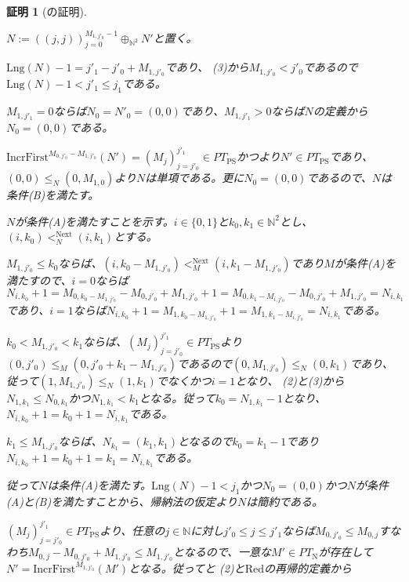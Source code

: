 \documentclass[dvipdfmx,uplatex]{jsarticle}
\theoremstyle{customnonumberbreakfortheorem}
\theoremstyle{customnonumberbreakforproof}
\newtheorem{hideableproof}{証明}
\begin{document}
\begin{hideableproof}[の証明]
\begin{indented}
\begin{indented}
\begin{indented}
\begin{indented}
					\item \(N := ((j,j))_{j=0}^{M_{1,j'_0}-1} \oplus_{\mathbb{N}^2} N'\)と置く。
					\item \(\textrm{Lng}(N)-1 = j'_1-j'_0+M_{1,j'_0}\)であり、 (3)から\(M_{1,j'_0} < j'_0\)であるので\(\textrm{Lng}(N)-1 < j'_1 \leq j_1\)である。
					\item \(M_{1,j'_1} = 0\)ならば\(N_0 = N'_0 = (0,0)\)であり、\(M_{1,j'_1} > 0\)ならば\(N\)の定義から\(N_0 = (0,0)\)である。
					\item \(\textrm{IncrFirst}^{M_{0,j'_0}-M_{1,j'_0}}(N') = (M_j)_{j=j'_0}^{j'_1} \in PT_{\textrm{PS}}\)かつより\(N' \in PT_{\textrm{PS}}\)であり、\((0,0) \leq_N (0,M_{1,0})\)より\(N\)は単項である。更に\(N_0 = (0,0)\)であるので、\(N\)は条件(B)を満たす。
					\item \(N\)が条件(A)を満たすことを示す。\(i \in \{0,1\}\)と\(k_0,k_1 \in \mathbb{N}^2\)とし、\((i,k_0) <_N^{\textrm{Next}} (i,k_1)\)とする。
					\begin{indented}
						\item \(M_{1,j'_0} \leq k_0\)ならば、\((i,k_0-M_{1,j'_0}) <_M^{\textrm{Next}} (i,k_1-M_{1,j'_0})\)であり\(M\)が条件(A)を満たすので、\(i=0\)ならば\(N_{i,k_0}+1 = M_{0,k_0-M_{1,j'_0}}-M_{0,j'_0}+M_{1,j'_0}+1 = M_{0,k_1-M_{i,j'_0}}-M_{0,j'_0}+M_{1,j'_0} = N_{i,k_1}\)であり、\(i=1\)ならば\(N_{i,k_0}+1 = M_{1,k_0-M_{1,j'_0}}+1 = M_{1,k_1-M_{i,j'_0}} = N_{i,k_1}\)である。
						\item \(k_0 < M_{1,j'_0} < k_1\)ならば、\((M_j)_{j=j'_0}^{j'_1} \in PT_{\textrm{PS}}\)より\((0,j'_0) \leq_M (0,j'_0+k_1-M_{1,j'_0})\)であるので\((0,M_{1,j'_0}) \leq_N (0,k_1)\)であり、従って\((1,M_{1,j'_0}) \leq_N (1,k_1)\)でなくかつ\(i=1\)となり、 (2)と(3)から\(N_{1,k_1} \leq N_{0,k_1}\)かつ\(N_{1,k_1} < k_1\)となる。従って\(k_0 = N_{1,k_1}-1\)となり、\(N_{i,k_0}+1 = k_0+1 = N_{i,k_1}\)である。
						\item \(k_1 \leq M_{1,j'_0}\)ならば、\(N_{k_1} = (k_1,k_1)\)となるので\(k_0 = k_1-1\)であり\(N_{i,k_0}+1 = k_0+1 = k_1 = N_{i,k_1}\)である。
					\end{indented}
					\item 従って\(N\)は条件(A)を満たす。\(\textrm{Lng}(N)-1 < j_1\)かつ\(N_0 = (0,0)\)かつ\(N\)が条件(A)と(B)を満たすことから、帰納法の仮定より\(N\)は簡約である。
					\item \((M_j)_{j=j'_0}^{j'_1} \in PT_{\textrm{PS}}\)より、任意の\(j \in \mathbb{N}\)に対し\(j'_0 \leq j \leq j'_1\)ならば\(M_{0,j'_0} \leq M_{0,j}\)すなわち\(M_{0,j}-M_{0,j'_0}+M_{1,j'_0} \leq M_{1,j'_0}\)となるので、一意な\(M' \in PT_{\textrm{N}}\)が存在して\(N' = \textrm{IncrFirst}^{M_{1,j'_0}}(M')\)となる。従ってと (2)と\(\textrm{Red}\)の再帰的定義から

\end{indented}
\end{indented}
\end{indented}
\end{indented}
\end{hideableproof}
\end{document}
